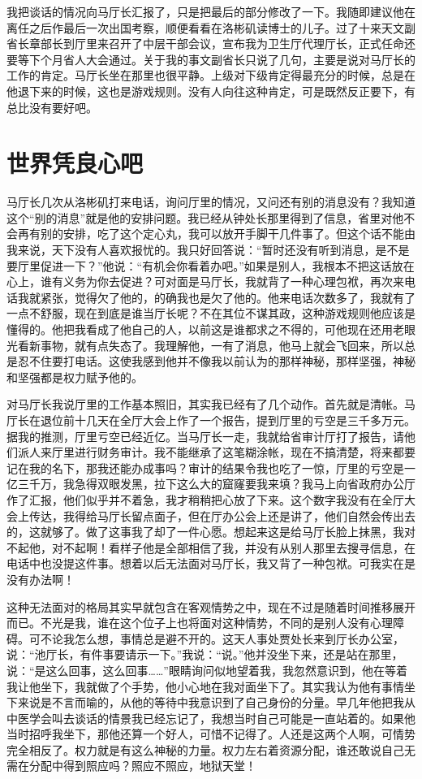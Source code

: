 \documentclass[12pt,oneside]{book}
\begin{document}
我把谈话的情况向马厅长汇报了，只是把最后的部分修改了一下。我随即建议他在离任之后作最后一次出国考察，顺便看看在洛彬矶读博士的儿子。过了十来天文副省长章部长到厅里来召开了中层干部会议，宣布我为卫生厅代理厅长，正式任命还要等下个月省人大会通过。关于我的事文副省长只说了几句，主要是说对马厅长的工作的肯定。马厅长坐在那里也很平静。上级对下级肯定得最充分的时候，总是在他退下来的时候，这也是游戏规则。没有人向往这种肯定，可是既然反正要下，有总比没有要好吧。


\chapter{世界凭良心吧}

马厅长几次从洛彬矶打来电话，询问厅里的情况，又问还有别的消息没有？我知道这个``别的消息''就是他的安排问题。我已经从钟处长那里得到了信息，省里对他不会再有别的安排，吃了这个定心丸，我可以放开手脚干几件事了。但这个话不能由我来说，天下没有人喜欢报忧的。我只好回答说：``暂时还没有听到消息，是不是要厅里促进一下？''他说：``有机会你看着办吧。''如果是别人，我根本不把这话放在心上，谁有义务为你去促进？可对面是马厅长，我就背了一种心理包袱，再次来电话我就紧张，觉得欠了他的，的确我也是欠了他的。他来电话次数多了，我就有了一点不舒服，现在到底是谁当厅长呢？不在其位不谋其政，这种游戏规则他应该是懂得的。他把我看成了他自己的人，以前这是谁都求之不得的，可他现在还用老眼光看新事物，就有点失态了。我理解他，一有了消息，他马上就会飞回来，所以总是忍不住要打电话。这使我感到他并不像我以前认为的那样神秘，那样坚强，神秘和坚强都是权力赋予他的。

对马厅长我说厅里的工作基本照旧，其实我已经有了几个动作。首先就是清帐。马厅长在退位前十几天在全厅大会上作了一个报告，提到厅里的亏空是三千多万元。据我的推测，厅里亏空已经近亿。当马厅长一走，我就给省审计厅打了报告，请他们派人来厅里进行财务审计。我不能继承了这笔糊涂帐，现在不搞清楚，将来都要记在我的名下，那我还能办成事吗？审计的结果令我也吃了一惊，厅里的亏空是一亿三千万，我急得双眼发黑，拉下这么大的窟窿要我来填？我马上向省政府办公厅作了汇报，他们似乎并不着急，我才稍稍把心放了下来。这个数字我没有在全厅大会上传达，我得给马厅长留点面子，但在厅办公会上还是讲了，他们自然会传出去的，这就够了。做了这事我了却了一件心愿。想起来这是给马厅长脸上抹黑，我对不起他，对不起啊！看样子他是全部相信了我，并没有从别人那里去搜寻信息，在电话中也没提这件事。想着以后无法面对马厅长，我又背了一种包袱。可我实在是没有办法啊！

这种无法面对的格局其实早就包含在客观情势之中，现在不过是随着时间推移展开而已。不光是我，谁在这个位子上也将面对这种情势，不同的是别人没有心理障碍。可不论我怎么想，事情总是避不开的。这天人事处贾处长来到厅长办公室，说：``池厅长，有件事要请示一下。''我说：``说。''他并没坐下来，还是站在那里，说：``是这么回事，这么回事\ldots\ldots{}''眼睛询问似地望着我，我忽然意识到，他在等着我让他坐下，我就做了个手势，他小心地在我对面坐下了。其实我认为他有事情坐下来说是不言而喻的，从他的等待中我意识到了自己身份的分量。早几年他把我从中医学会叫去谈话的情景我已经忘记了，我想当时自己可能是一直站着的。如果他当时招呼我坐下，那他还算一个好人，可惜不记得了。人还是这两个人啊，可情势完全相反了。权力就是有这么神秘的力量。权力左右着资源分配，谁还敢说自己无需在分配中得到照应吗？照应不照应，地狱天堂！
\end{document}
